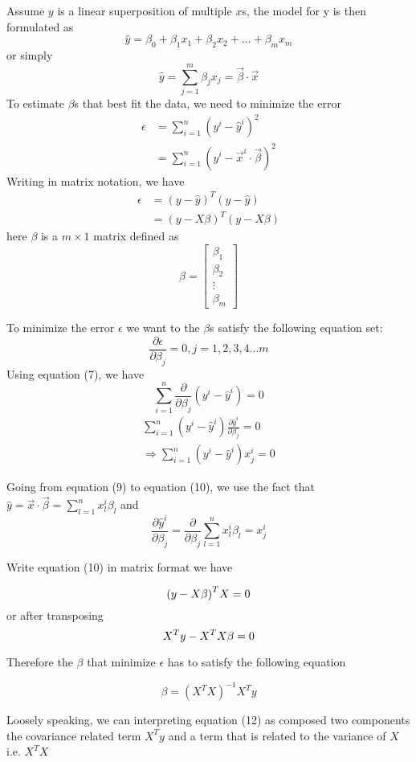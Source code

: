 \documentclass[12pt, oneside]{article}
\begin{document}
Assume $y$ is a linear superposition of multiple $x$s, the model for y is then formulated as 
$$\hat{y}=\beta_{0}+\beta_{1}x_1+\beta_{2}x_2+\hdots+\beta_{m}x_m$$
or simply
$$
\hat{y}=\sum\limits_{j=1}^{m}\beta_j x_j=\vec{\beta}\cdot\vec{x}
$$
To estimate $\beta$s that best fit the data, we need to minimize the error
\begin{align}
\epsilon&={\sum\limits_{i=1}^{n}(y^{i}-\hat{y}^{i})^2}\\
&={\sum\limits_{i=1}^{n}(y^{i}-\vec{x}^i\cdot\vec{\beta})^2}
\end{align}
Writing in matrix notation, we have
\begin{align*}
\epsilon&={(y-\hat{y})^T(y-\hat{y})}\\
&=(y-X\beta)^T(y-X\beta)
\end{align*}
here $\beta$ is a $m\times1$ matrix defined as 
$$
\beta=\begin{bmatrix}
    \beta_1\\
    \beta_2\\
	\vdots\\
    \beta_m
\end{bmatrix}
$$

To minimize the error $\epsilon$ we want to the ${\beta}$s satisfy the following equation set:
$$
\frac{\partial \epsilon}{\partial \beta_j}=0, j=1, 2, 3, 4 ... m
$$
Using equation (7), we have 
$$
{\sum\limits_{i=1}^{n}\frac{\partial}{\partial \beta_j}(y^{i}-\hat{y}^{i})=0}
$$
\begin{align}
\sum\limits_{i=1}^{n}(y^{i}-\hat{y}^{i})\frac{\partial\hat{y}^{i}}{\partial \beta_j}=0\\
\Rightarrow
\sum\limits_{i=1}^{n}(y^{i}-\hat{y}^{i})x^{i}_{j}=0
\end{align}

Going from equation (9) to equation (10), we use the fact that $\hat{y}=\vec{x}\cdot\vec{\beta}=\sum\limits_{l=1}^{n}x_l^i\beta_l$ and
\begin{equation}
\frac{\partial{\hat{y}^i}}{\partial{\beta_j}}=\frac{\partial}{\partial \beta_j}\sum\limits_{l=1}^{n}x_l^i\beta_l=x_j^i
\end{equation}

Write equation (10) in matrix format we have

$$
\mathnormal{(y-X \beta)}^{T}\mathnormal{X}=0
$$
or after transposing
$$
\mathnormal{X^{T}}\mathnormal{y}-\mathnormal{X^T}\mathnormal{X}\beta=0
$$

Therefore the $\beta$ that minimize $\epsilon$ has to satisfy the following equation

\begin{equation}
\beta=({X^T}{X})^{-1}{X^{T}}{y}
\end{equation}

Loosely speaking, we can interpreting equation (12) as composed two components the covariance related term $X^{T}y$ and a term that is related to the variance of $X$ i.e. ${X^T}{X}$
\end{document}
